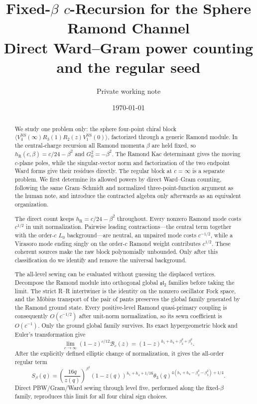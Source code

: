 \documentclass[11pt]{article}
\title{Fixed-\(\beta\) \(c\)-Recursion for the Sphere Ramond Channel\\[0.35em]
\large Direct Ward--Gram power counting and the regular seed}
\author{Private working note}
\date{\today}
\newcommand{\R}{\mathrm R}
\newcommand{\NS}{\mathrm{NS}}
\newcommand{\B}{\mathcal B}
\begin{document}
\maketitle

\begin{abstract}
We study one problem only: the sphere four-point chiral block
\(\langle V^{\NS}_4(\infty)R_3(1)R_2(z)V^{\NS}_1(0)\rangle\), factorized
through a generic Ramond module.  In the central-charge recursion all
Ramond momenta \(\beta\) are held fixed, so
\(h_\R(c,\beta)=c/24-\beta^2\) and \(G_0^2=-\beta^2\).
The Ramond Kac determinant gives the moving \(c\)-plane poles, while the
singular-vector norm and factorization of the two endpoint Ward forms
give their residues directly.  The regular block at \(c=\infty\) is a
separate problem.  We first determine its allowed powers by direct
Ward--Gram counting, following the same Gram--Schmidt and normalized
three-point-function argument as the human note, and introduce the
contracted algebra only afterwards as an equivalent organization.

The direct count keeps \(h_\R=c/24-\beta^2\) throughout.  Every nonzero
Ramond mode costs \(c^{1/2}\) in unit normalization.  Pairwise leading
contractions---the central term together with the order-\(c\) \(L_0\)
background---are neutral, an unpaired mode costs \(c^{-1/2}\), while a
Virasoro mode ending singly on the order-\(c\) Ramond weight contributes
\(c^{1/2}\).  These coherent sources make the raw block polynomially
unbounded.  Only after this classification do we identify and remove the
universal background.

The all-level sewing can be evaluated without guessing the displaced
vertices.  Decompose the Ramond module into orthogonal global
\(\mathfrak{sl}_2\) families before taking the limit.  The strict R--R
intertwiner is the identity on the nonzero oscillator Fock space, and
the Möbius transport of the pair of pants preserves the global family
generated by the Ramond ground state.  Every positive-level Ramond
quasi-primary coupling is consequently \(O(c^{-1/2})\) after unit-norm
normalization, so its sewn coefficient is \(O(c^{-1})\).  Only the
ground global family survives.  Its exact hypergeometric block and
Euler's transformation give
\[
 \lim_{c\to\infty}(1-z)^{c/12}\B_c(z)
 =
 (1-z)^{h_1+h_4+\beta_2^2+\beta_3^2}.
\]
After the explicitly defined elliptic change of normalization, it gives
the all-order regular term
\[
 S_\beta(q)=
 \left(\frac{16q}{z(q)}\right)^{\beta^2}
 (1-z(q))^{h_1+h_4+1/16}
 \theta_3(q)^{
 4(h_1+h_4-\beta_2^2-\beta_3^2)+1/4}.
\]
Direct PBW/Gram/Ward sewing through level five, performed along the
fixed-\(\beta\) family, reproduces this limit for all four chiral sign
choices.
\end{abstract}
\end{document}

